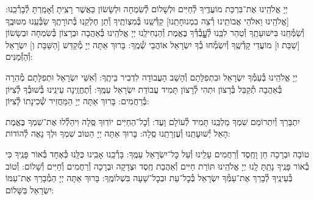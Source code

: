 \documentclass[twoside, openany, parskip=half, 11pt]{book}
\begin{document}
יְיָ אֱלֹהֵֽינוּ אֶת־בִּרְכַּת מוֹעֲדֶֽיךָ לְ֯חַיִּים וּלְשָׁלוֹם לְ֯שִׂמְחָה וּלְשָׂשׂוֹן כַּאֲשֶׁר רָצִֽיתָ וְ֯אָמַֽרְתָּ לְ֯בָרְ֯כֵֽנוּ: [\shabbos אֱלֹהֵֽינוּ וֵאלֹהֵי אֲבוֹתֵֽינוּ רְ֯צֵה בִמְנוּחָתֵֽנוּ] קַדְּ֯שֵֽׁנוּ בְּ֯מִצְוֹתֶֽיךָ וְ֯תֵן חֶלְקֵֽנוּ בְּ֯תוֹרָתֶֽךָ שַׂבְּ֯עֵֽנוּ מִטּוּבֶֽךָ וְ֯שַׂמְּ֯חֵֽנוּ בִּישׁוּעָתֶֽךָ וְ֯טַהֵר לִבֵּֽנוּ לְ֯עׇׇׇׇבְ֯דְּ֯ךָ בֶּאֱמֶת וְ֯הַנְחִילֵֽנוּ יְיָ אֱלֹהֵֽינוּ בְּ֯אַהֲבָה וּבְרָצוֹן בְּ֯שִׂמְחָה וּבְשָׂשׂוֹן [\shabbos שַׁבַּת וּ] מוֹעֲדֵי קָדְ֯שֶֽׁךָ וְ֯יִשְׂמְ֯חוּ בְ֯ךָ יִשְׂרָאֵל אוֹהֲבֵי שְׁ֯מֶֽךָ: בָּרוּךְ אַתָּה יְיָ מְ֯קַדֵּשׁ
[\shabbos הַשַּׁבָּת וְ] יִשְׂרָאֵל וְ֯הַזְּ֯מַנִּים:


יְיָ אֱלֹהֵֽינוּ בְּ֯עַמְּ֯ךָ יִשְׂרָאֵל וּבִתְפִלָּתָם וְ֯הָשֵׁב הָעֲבוֹדָה לִדְבִיר בֵּיתֶֽךָ: וְ֯אִשֵּׁי יִשְׂרָאֵל וּתְפִלָּתָם מְ֯הֵרָה בְּ֯אַהֲבָה תְ֯קַבֵּל בְּ֯רָצוֹן וּתְהִי לְ֯רָצוֹן תָּמִיד עֲבוֹדַת יִשְׂרָאֵל עַמֶּֽךָ: וְ֯תֶחֱזֶֽינָה עֵינֵֽינוּ בְּ֯שׁוּבְ֯ךָ לְ֯צִיּוֹן בְּ֯רַחֲמִים: בָּרוּךְ אַתָּה יְיָ הַמַּחֲזִיר שְׁ֯כִינָתוֹ לְ֯צִיּוֹן:

\modim


\vspace{-\baselineskip}
יִתְבָּרַךְ וְ֯יִתְרוֹמַם שִׁמְךָ מַלְכֵּֽנוּ תָּמִיד לְ֯עוֹלָם וָעֶד: וְ֯כׇל־הַחַיִּים יוֹדֽוּךָ סֶּֽלָה וִיהַלְ֯לוּ אֶת־שִׁמְךָ בֶּאֱמֶת הָאֵל יְ֯שׁוּעָתֵֽנוּ וְ֯עֶזְרָתֵֽנוּ סֶֽלָה: בָּרוּךְ אַתָּה יְיָ הַטּוֹב שִׁמְךָ וּלְךָ נָאֶה לְ֯הוֹדוֹת:



טוֹבָה וּבְרָכָה חֵן וָחֶֽסֶד וְ֯רַחֲמִים עָלֵֽינוּ וְ֯עַל כׇּל־יִשְׂרָאֵל עַמֶּֽךָ: בָּרְ֯כֵֽנוּ אָבִֽינוּ כֻּלָּֽנוּ כְּ֯אֶחָד בְּ֯אוֹר פָּנֶֽיךָ כִּי בְ֯אוֹר פָּנֶֽיךָ נָתַֽתָּ לָֽנוּ יְיָ אֱלֹהֵֽינוּ תּוֹרַת חַיִּים וְ֯אַהֲבַת חֶֽסֶד וּצְדָקָה וּבְרָכָה וְ֯רַחֲמִים וְ֯חַיִּים וְ֯שָׁלוֹם: וְ֯טוֹב בְּ֯עֵינֶֽיךָ לְ֯בָרֵךְ אֶת־עַמְּ֯ךָ יִשְׂרָאֵל בְּ֯כׇל־עֵת וּבְכׇל־שָׁעָה בִּשְׁלוֹמֶֽךָ: בָּרוּךְ אַתָּה יְיָ הַמְ֯בָרֵךְ אֶת־עַמּוֹ יִשְׂרָאֵל בַּשָּׁלוֹם:

\tachanunim

\vfill


\\

\sepline

\\
\\
\end{document}
